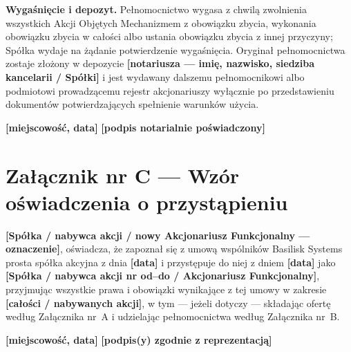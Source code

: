 \documentclass[12pt,a4paper]{report}
\newcommand{\field}[1]{\textbf{[#1]}}
\newcommand{\CompanyFull}{Basilisk Systems prosta spółka akcyjna}
\begin{document}
\textbf{Wygaśnięcie i depozyt.} Pełnomocnictwo wygasa z chwilą zwolnienia wszystkich Akcji Objętych Mechanizmem z obowiązku zbycia, wykonania obowiązku zbycia w całości albo ustania obowiązku zbycia z innej przyczyny; Spółka wydaje na żądanie potwierdzenie wygaśnięcia. Oryginał pełnomocnictwa zostaje złożony w depozycie \field{notariusza --- imię, nazwisko, siedziba kancelarii / Spółki} i jest wydawany dalszemu pełnomocnikowi albo podmiotowi prowadzącemu rejestr akcjonariuszy wyłącznie po przedstawieniu dokumentów potwierdzających spełnienie warunków użycia.

\field{miejscowość, data} \hfill \field{podpis notarialnie poświadczony}

\newpage
\section*{Załącznik nr C — Wzór oświadczenia o przystąpieniu}

\field{Spółka / nabywca akcji / nowy Akcjonariusz Funkcjonalny --- oznaczenie}, oświadcza, że zapoznał się z umową wspólników \CompanyFull{} z dnia \field{data} i przystępuje do niej z dniem \field{data} jako \field{Spółka / nabywca akcji nr od--do / Akcjonariusz Funkcjonalny}, przyjmując wszystkie prawa i obowiązki wynikające z tej umowy w zakresie \field{całości / nabywanych akcji}, w tym --- jeżeli dotyczy --- składając ofertę według Załącznika nr~A i udzielając pełnomocnictwa według Załącznika nr~B.

\field{miejscowość, data} \hfill \field{podpis(y) zgodnie z reprezentacją}
\end{document}
